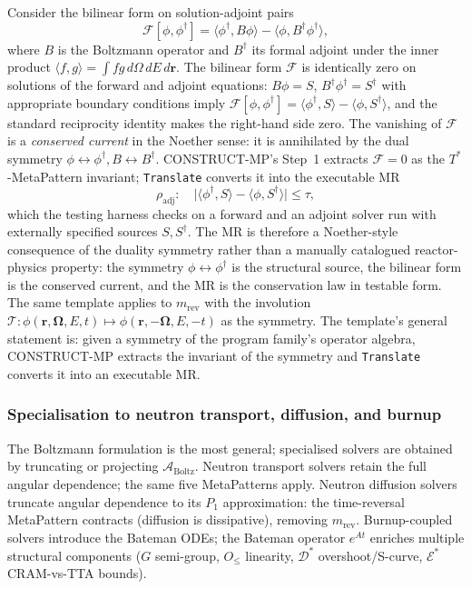 \documentclass[acmsmall,screen,review]{acmart}
\begin{document}
Consider the bilinear form on solution-adjoint pairs
\begin{equation}
\label{eq:bilinear-boltz}
\mathcal{F}[\phi, \phi^{\dagger}] = \langle \phi^{\dagger}, B\phi \rangle - \langle \phi, B^{\dagger}\phi^{\dagger} \rangle,
\end{equation}
where $B$ is the Boltzmann operator and $B^{\dagger}$ its formal adjoint under the inner product $\langle f, g \rangle = \int f g \,d\Omega\,dE\,d\mathbf{r}$. The bilinear form $\mathcal{F}$ is identically zero on solutions of the forward and adjoint equations: $B\phi = S$, $B^{\dagger}\phi^{\dagger} = S^{\dagger}$ with appropriate boundary conditions imply $\mathcal{F}[\phi, \phi^{\dagger}] = \langle \phi^{\dagger}, S \rangle - \langle \phi, S^{\dagger} \rangle$, and the standard reciprocity identity makes the right-hand side zero. The vanishing of $\mathcal{F}$ is a \emph{conserved current} in the Noether sense: it is annihilated by the dual symmetry $\phi \leftrightarrow \phi^{\dagger}, B \leftrightarrow B^{\dagger}$. CONSTRUCT-MP's Step~1 extracts $\mathcal{F} = 0$ as the $T^{*}$-MetaPattern invariant; \texttt{Translate} converts it into the executable MR
\begin{equation}
\label{eq:m-adj-mr}
\rho_{\mathrm{adj}}: \quad \big| \langle \phi^{\dagger}, S \rangle - \langle \phi, S^{\dagger} \rangle \big| \le \tau,
\end{equation}
which the testing harness checks on a forward and an adjoint solver run with externally specified sources $S, S^{\dagger}$. The MR is therefore a Noether-style consequence of the duality symmetry rather than a manually catalogued reactor-physics property: the symmetry $\phi \leftrightarrow \phi^{\dagger}$ is the structural source, the bilinear form is the conserved current, and the MR is the conservation law in testable form. The same template applies to $m_{\mathrm{rev}}$ with the involution $\mathcal{T}: \phi(\mathbf{r}, \boldsymbol{\Omega}, E, t) \mapsto \phi(\mathbf{r}, -\boldsymbol{\Omega}, E, -t)$ as the symmetry. The template's general statement is: given a symmetry of the program family's operator algebra, CONSTRUCT-MP extracts the invariant of the symmetry and \texttt{Translate} converts it into an executable MR.

\subsubsection{Specialisation to neutron transport, diffusion, and burnup}

The Boltzmann formulation is the most general; specialised solvers are obtained by truncating or projecting $\mathcal{A}_{\mathrm{Boltz}}$. Neutron transport solvers retain the full angular dependence; the same five MetaPatterns apply. Neutron diffusion solvers truncate angular dependence to its $P_1$ approximation: the time-reversal MetaPattern contracts (diffusion is dissipative), removing $m_{\mathrm{rev}}$. Burnup-coupled solvers introduce the Bateman ODEs; the Bateman operator $e^{At}$ enriches multiple structural components ($G$ semi-group, $O_{\le}$ linearity, $\mathcal{D}^{*}$ overshoot/S-curve, $\mathcal{E}^{*}$ CRAM-vs-TTA bounds).
\end{document}

